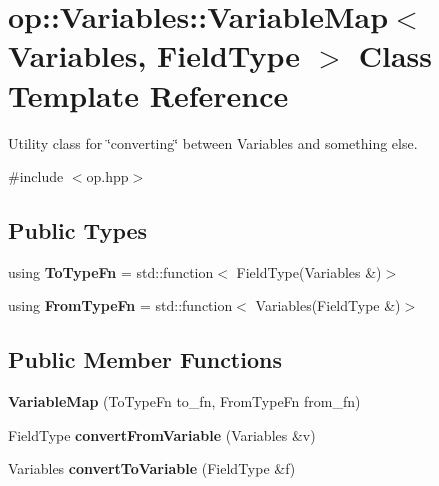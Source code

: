 \hypertarget{classop_1_1Variables_1_1VariableMap}{\section{op\-:\-:Variables\-:\-:Variable\-Map$<$ Variables, Field\-Type $>$ Class Template Reference}
\label{classop_1_1Variables_1_1VariableMap}
}


Utility class for \char`\"{}converting\char`\"{} between Variables and something else.  




{\ttfamily \#include $<$op.\-hpp$>$}

\subsection*{Public Types}
\begin{DoxyCompactItemize}
\item 
\hypertarget{classop_1_1Variables_1_1VariableMap_a44075cd0bfdf6dff5f8c4ee67659addf}{using {\bfseries To\-Type\-Fn} = std\-::function$<$ Field\-Type(Variables \&)$>$}\label{classop_1_1Variables_1_1VariableMap_a44075cd0bfdf6dff5f8c4ee67659addf}

\item 
\hypertarget{classop_1_1Variables_1_1VariableMap_a02e59ee7e05d97048a745576a92af1f6}{using {\bfseries From\-Type\-Fn} = std\-::function$<$ Variables(Field\-Type \&)$>$}\label{classop_1_1Variables_1_1VariableMap_a02e59ee7e05d97048a745576a92af1f6}

\end{DoxyCompactItemize}
\subsection*{Public Member Functions}
\begin{DoxyCompactItemize}
\item 
\hypertarget{classop_1_1Variables_1_1VariableMap_a280fcad54e5f7417fec536ff795d6e48}{{\bfseries Variable\-Map} (To\-Type\-Fn to\-\_\-fn, From\-Type\-Fn from\-\_\-fn)}\label{classop_1_1Variables_1_1VariableMap_a280fcad54e5f7417fec536ff795d6e48}

\item 
\hypertarget{classop_1_1Variables_1_1VariableMap_a9c46abea1694e3337ab8608a20b71043}{Field\-Type {\bfseries convert\-From\-Variable} (Variables \&v)}\label{classop_1_1Variables_1_1VariableMap_a9c46abea1694e3337ab8608a20b71043}

\item 
\hypertarget{classop_1_1Variables_1_1VariableMap_a41e604a514cbadb13b613b3d35743c86}{Variables {\bfseries convert\-To\-Variable} (Field\-Type \&f)}\label{classop_1_1Variables_1_1VariableMap_a41e604a514cbadb13b613b3d35743c86}

\end{DoxyCompactItemize}
